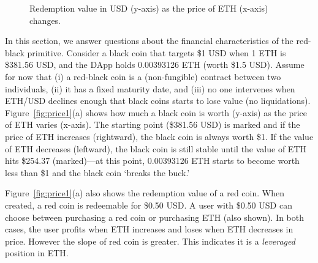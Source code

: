 \begin{figure}[t]
    \centering
        \qquad
    \caption{Redemption value in USD (y-axis) as the price of ETH (x-axis) changes. \label{fig:price1} \label{fig:price2}}
\end{figure}

In this section, we answer questions about the financial characteristics of the red-black primitive. Consider a black coin that targets \$1 USD when 1 ETH is \$381.56 USD, and the DApp holds 0.00393126 ETH (worth \$1.5 USD).  Assume for now that (i) a red-black coin is a (non-fungible) contract between two individuals, (ii) it has a fixed maturity date, and (iii) no one intervenes when ETH/USD declines enough that black coins starts to lose value (no liquidations). Figure~\ref{fig:price1}(a) shows how much a black coin is worth (y-axis) as the price of ETH varies (x-axis). The starting point (\$381.56 USD) is marked and if the price of ETH increases (rightward), the black coin is always worth \$1. If the value of ETH decreases (leftward), the black coin is still stable until the value of ETH hits \$254.37 (marked)---at this point, 0.00393126 ETH starts to become worth less than \$1 and the black coin `breaks the buck.'

Figure~\ref{fig:price1}(a) also shows the redemption value of a red coin. When created, a red coin is redeemable for \$0.50 USD. A user with \$0.50 USD can choose between purchasing a red coin or purchasing ETH (also shown). In both cases, the user profits when ETH increases and loses when ETH decreases in price. However the slope of red coin is greater. This indicates it is a \emph{leveraged} position in ETH.  

